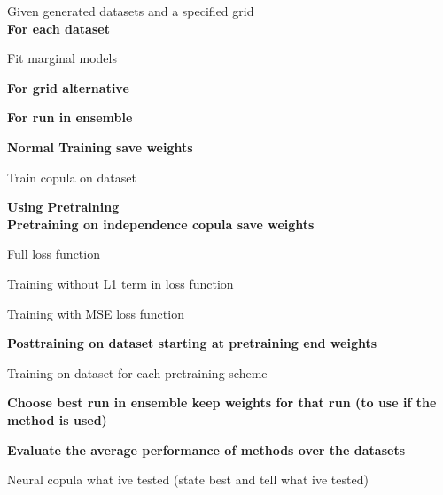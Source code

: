 \begin{generalinstructions}
Given generated datasets and a specified grid\\
\textbf{For each dataset}
\begin{compactitem}
    \item Fit marginal models
    \item \textbf{For grid alternative}
    \begin{compactitem}
        \item \textbf{For run in ensemble}
        \begin{compactitem}
            \item \textbf{Normal Training save weights} 
            \begin{compactitem}
                \item Train copula on dataset
            \end{compactitem}
            \item \textbf{Using Pretraining}\\
            \textbf{Pretraining on independence copula save weights}
            \begin{compactitem}             
                \item Full loss function
                \item Training without L1 term in loss function
                \item Training with MSE loss function
            \end{compactitem}
            \textbf{Posttraining on dataset starting at pretraining end weights}
            \begin{compactitem}             
                \item Training on dataset for each pretraining scheme
            \end{compactitem}
        \end{compactitem}
        \item \textbf{Choose best run in ensemble keep weights for that run (to use if the method is used)}
    \end{compactitem}
\end{compactitem}
\textbf{Evaluate the average performance of methods over the datasets}
\end{generalinstructions}



Neural copula what ive tested (state best and tell what ive tested)

 


